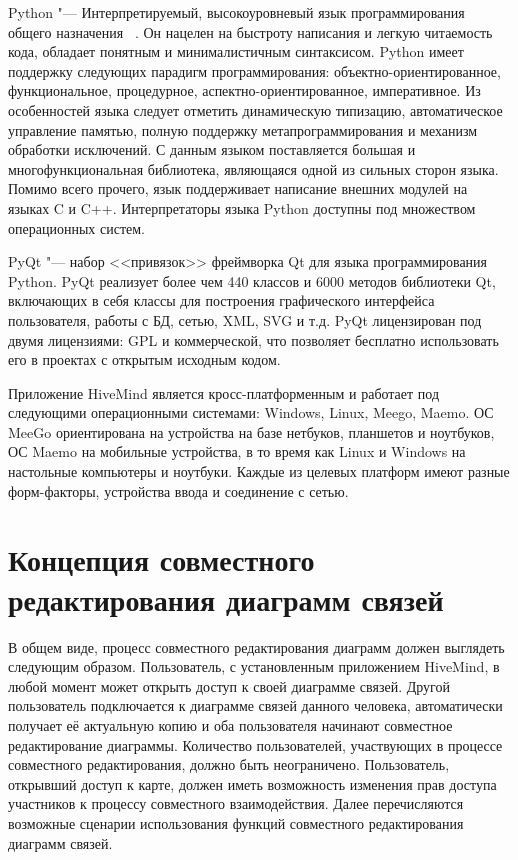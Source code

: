 Python "--- Интерпретируемый, высокоуровневый язык программирования общего
назначения ~\cite{python}. Он нацелен на быстроту написания и легкую читаемость
кода, обладает понятным и минималистичным синтаксисом. Python имеет поддержку
следующих парадигм программирования: объектно-ориентированное, функциональное,
процедурное, аспектно-ориентированное, императивное. Из особенностей языка
следует отметить динамическую типизацию, автоматическое управление памятью,
полную поддержку метапрограммирования и механизм обработки исключений. С данным
языком поставляется большая и многофункциональная библиотека, являющаяся одной
из сильных сторон языка. Помимо всего прочего, язык поддерживает написание
внешних модулей на языках C и C++. Интерпретаторы языка Python доступны под
множеством операционных систем.

PyQt "--- набор <<привязок>> фреймворка Qt для языка программирования Python.
PyQt реализует более чем 440 классов и 6000 методов библиотеки Qt, включающих в
себя классы для построения графического интерфейса пользователя, работы с БД,
сетью, XML, SVG и т.д. PyQt лицензирован под двумя лицензиями: GPL и
коммерческой, что позволяет бесплатно использовать его в проектах с открытым
исходным кодом.

Приложение HiveMind является кросс-платформенным и работает под следующими
операционными системами: Windows, Linux, Meego, Maemo. ОС MeeGo ориентирована на
устройства на базе нетбуков, планшетов и ноутбуков, ОС Maemo на мобильные
устройства, в то время как Linux и Windows на настольные компьютеры и ноутбуки.
Каждые из целевых платформ имеют разные форм-факторы, устройства ввода и
соединение с сетью.


\section{Концепция совместного редактирования диаграмм связей}
\label{sec:collaborative_mindmapping}
В общем виде, процесс совместного редактирования диаграмм должен выглядеть
следующим образом. Пользователь, с установленным приложением HiveMind, в любой
момент может открыть доступ к своей диаграмме связей. Другой пользователь
подключается к диаграмме связей данного человека, автоматически получает её
актуальную копию и оба пользователя начинают совместное редактирование
диаграммы. Количество пользователей, участвующих в процессе совместного
редактирования, должно быть неограничено. Пользователь, открывший доступ к
карте, должен иметь возможность изменения прав доступа участников к процессу
совместного взаимодействия. Далее перечисляются возможные сценарии использования
функций совместного редактирования диаграмм связей.

